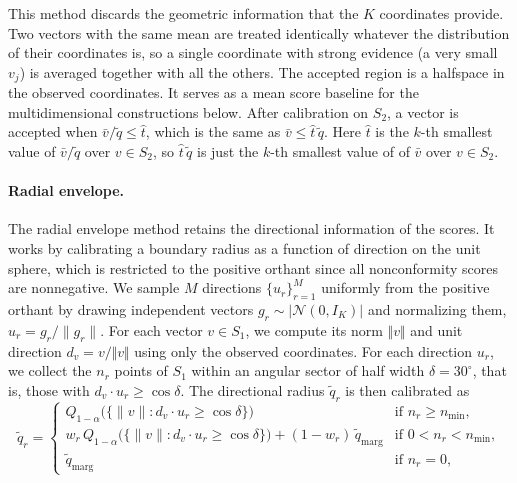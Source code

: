 This method discards the geometric information that the $K$ coordinates provide. Two vectors with the same mean are treated 
identically whatever the distribution of their coordinates is, so a single coordinate with strong evidence (a very small $v_j$) is 
averaged together with all the others. The accepted region is a halfspace in the observed coordinates. It serves as a mean score baseline 
for the multidimensional constructions below. After calibration on $S_2$, a vector is accepted when $\bar v/\tilde q\le\hat t$, 
which is the same as $\bar v\le\hat t\,\tilde q$. Here $\hat t$ is the $k$-th smallest value of $\bar v/\tilde q$ over $v\in S_2$, 
so $\hat t\,\tilde q$ is just the $k$-th smallest value of of $\bar v$ over $v\in S_2$. 



 
\paragraph{Radial envelope.} The radial envelope method retains the directional information of the scores. It works by calibrating 
a boundary radius as a function of direction on the unit sphere, which is restricted to the positive orthant since all nonconformity 
scores are nonnegative. We sample $M$ directions $\{u_r\}_{r=1}^M$ uniformly from the positive orthant by drawing independent vectors $g_r\sim|\mathcal 
N(0,I_K)|$ and normalizing them, $u_r=g_r/\|g_r\|$. For each vector $v\in S_1$, we compute its norm $\Vert{}v\Vert{}$ and  
unit direction $d_v = v / \Vert{}v\Vert{}$ using only the observed coordinates.
For each direction $u_r$, we collect the $n_r$ points of $S_1$ within an angular sector of half width $\delta=30^\circ$, that is, 
those with $d_v\cdot u_r\ge\cos\delta$. The directional radius $\tilde q_r$ is then calibrated as
\begin{equation}\label{eq:radii}
\tilde q_r=\begin{cases}
Q_{1-\alpha}\bigl(\{\|v\|:d_v\cdot u_r\ge\cos\delta\}\bigr) & \text{if } n_r\ge n_{\min},\\[1ex]
w_r\,Q_{1-\alpha}\bigl(\{\|v\|:d_v\cdot u_r\ge\cos\delta\}\bigr)+(1-w_r)\,\tilde q_{\mathrm{marg}} & \text{if } 
0<n_r<n_{\min},\\[1ex]
\tilde q_{\mathrm{marg}} & \text{if } n_r=0,
\end{cases}
\end{equation}

